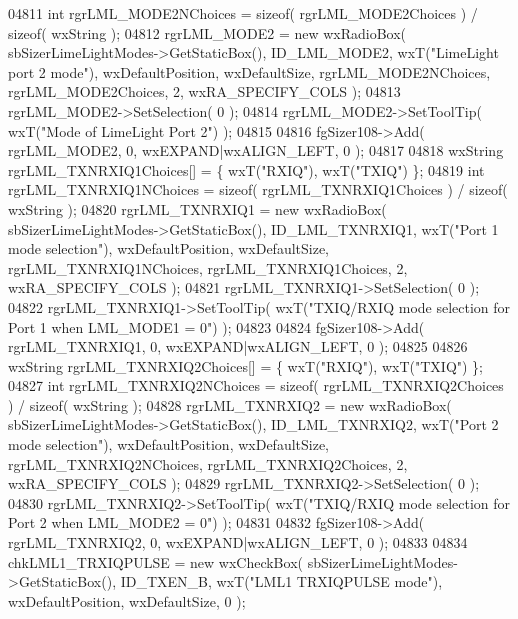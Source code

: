 \begin{DoxyCode}
04811     \textcolor{keywordtype}{int} rgrLML\_MODE2NChoices = \textcolor{keyword}{sizeof}( rgrLML\_MODE2Choices ) / \textcolor{keyword}{sizeof}( wxString );
04812     rgrLML_MODE2 = \textcolor{keyword}{new} wxRadioBox( sbSizerLimeLightModes->GetStaticBox(), 
      ID_LML_MODE2, wxT(\textcolor{stringliteral}{"LimeLight port 2 mode"}), wxDefaultPosition, wxDefaultSize, rgrLML\_MODE2NChoices, 
      rgrLML\_MODE2Choices, 2, wxRA\_SPECIFY\_COLS );
04813     rgrLML_MODE2->SetSelection( 0 );
04814     rgrLML_MODE2->SetToolTip( wxT(\textcolor{stringliteral}{"Mode of LimeLight Port 2"}) );
04815     
04816     fgSizer108->Add( rgrLML_MODE2, 0, wxEXPAND|wxALIGN\_LEFT, 0 );
04817     
04818     wxString rgrLML\_TXNRXIQ1Choices[] = \{ wxT(\textcolor{stringliteral}{"RXIQ"}), wxT(\textcolor{stringliteral}{"TXIQ"}) \};
04819     \textcolor{keywordtype}{int} rgrLML\_TXNRXIQ1NChoices = \textcolor{keyword}{sizeof}( rgrLML\_TXNRXIQ1Choices ) / \textcolor{keyword}{sizeof}( wxString );
04820     rgrLML_TXNRXIQ1 = \textcolor{keyword}{new} wxRadioBox( sbSizerLimeLightModes->GetStaticBox(), 
      ID_LML_TXNRXIQ1, wxT(\textcolor{stringliteral}{"Port 1 mode selection"}), wxDefaultPosition, wxDefaultSize, rgrLML\_TXNRXIQ1NChoices, 
      rgrLML\_TXNRXIQ1Choices, 2, wxRA\_SPECIFY\_COLS );
04821     rgrLML_TXNRXIQ1->SetSelection( 0 );
04822     rgrLML_TXNRXIQ1->SetToolTip( wxT(\textcolor{stringliteral}{"TXIQ/RXIQ mode selection for Port 1 when LML\_MODE1 = 0"}) );
04823     
04824     fgSizer108->Add( rgrLML_TXNRXIQ1, 0, wxEXPAND|wxALIGN\_LEFT, 0 );
04825     
04826     wxString rgrLML\_TXNRXIQ2Choices[] = \{ wxT(\textcolor{stringliteral}{"RXIQ"}), wxT(\textcolor{stringliteral}{"TXIQ"}) \};
04827     \textcolor{keywordtype}{int} rgrLML\_TXNRXIQ2NChoices = \textcolor{keyword}{sizeof}( rgrLML\_TXNRXIQ2Choices ) / \textcolor{keyword}{sizeof}( wxString );
04828     rgrLML_TXNRXIQ2 = \textcolor{keyword}{new} wxRadioBox( sbSizerLimeLightModes->GetStaticBox(), 
      ID_LML_TXNRXIQ2, wxT(\textcolor{stringliteral}{"Port 2 mode selection"}), wxDefaultPosition, wxDefaultSize, rgrLML\_TXNRXIQ2NChoices, 
      rgrLML\_TXNRXIQ2Choices, 2, wxRA\_SPECIFY\_COLS );
04829     rgrLML_TXNRXIQ2->SetSelection( 0 );
04830     rgrLML_TXNRXIQ2->SetToolTip( wxT(\textcolor{stringliteral}{"TXIQ/RXIQ mode selection for Port 2 when LML\_MODE2 = 0"}) );
04831     
04832     fgSizer108->Add( rgrLML_TXNRXIQ2, 0, wxEXPAND|wxALIGN\_LEFT, 0 );
04833     
04834     chkLML1_TRXIQPULSE = \textcolor{keyword}{new} wxCheckBox( sbSizerLimeLightModes->GetStaticBox(), 
      ID_TXEN_B, wxT(\textcolor{stringliteral}{"LML1 TRXIQPULSE mode"}), wxDefaultPosition, wxDefaultSize, 0 );

\end{DoxyCode}
